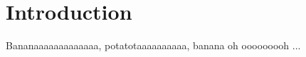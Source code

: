 \chapter{Introduction}
\label{chap:intro}

Bananaaaaaaaaaaaaa, potatotaaaaaaaaaa, banana oh ooooooooh ...
